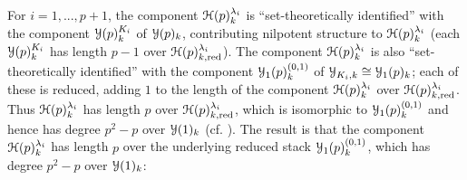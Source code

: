 \documentclass[11pt]{amsart}
\theoremstyle{definition}
\begin{document}
\begin{center}
\end{center}
For $i = 1,...,p+1$, the component ${\mathbf{\EuScript{H}}}(p)^{\lambda_i}_k$ is ``set-theoretically identified'' with the component ${\mathbf{\EuScript{Y}}}(p)^{K_i}_k$ of ${\mathbf{\EuScript{Y}}}(p)_k$, contributing nilpotent structure to ${\mathbf{\EuScript{H}}}(p)^{\lambda_i}_k$ (each ${\mathbf{\EuScript{Y}}}(p)^{K_i}_k$ has length $p-1$ over ${\mathbf{\EuScript{H}}}(p)^{\lambda_i}_{k,\mathrm{red}}$). The component ${\mathbf{\EuScript{H}}}(p)^{\lambda_i}_k$ is also ``set-theoretically identified'' with the component ${\mathbf{\EuScript{Y}}}_1(p)^{(0,1)}_k$ of ${\mathbf{\EuScript{Y}}}_{K_i,k} \cong {\mathbf{\EuScript{Y}}}_1(p)_k$; each of these is reduced, adding $1$ to the length of the component ${\mathbf{\EuScript{H}}}(p)^{\lambda_i}_k$ over ${\mathbf{\EuScript{H}}}(p)^{\lambda_i}_{k,\mathrm{red}}$. Thus ${\mathbf{\EuScript{H}}}(p)^{\lambda_i}_k$ has length $p$ over ${\mathbf{\EuScript{H}}}(p)^{\lambda_i}_{k,\mathrm{red}}$, which is isomorphic to ${\mathbf{\EuScript{Y}}}_1(p)^{(0,1)}_k$ and hence has degree $p^2-p$ over ${\mathbf{\EuScript{Y}}}(1)_k$ (cf. \cite[13.5.6]{KM1}). The result is that the component ${\mathbf{\EuScript{H}}}(p)^{\lambda_i}_k$ has length $p$ over the underlying reduced stack ${\mathbf{\EuScript{Y}}}_1(p)^{(0,1)}_k$, which has degree $p^2-p$ over ${\mathbf{\EuScript{Y}}}(1)_k$:
\end{document}
